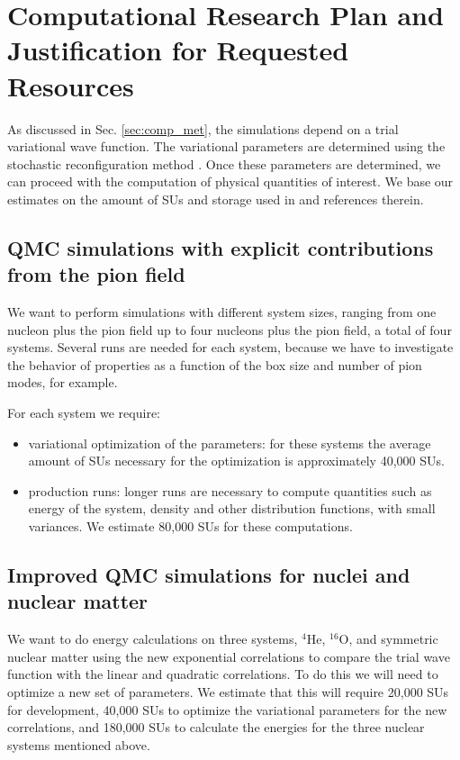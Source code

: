\documentclass[12pt,letterpaper]{article}
\begin{document}
\section{Computational Research Plan and Justification for Requested 
Resources}

As discussed in Sec. \ref{sec:comp_met}, the simulations depend on a trial 
variational wave function. The variational parameters are determined using 
the stochastic reconfiguration method \cite{cas04}. Once these parameters 
are determined, we can proceed with the computation of physical quantities 
of interest. We base our estimates on the amount of SUs and storage used in 
\cite{car15} 
and references therein.

\subsection{QMC simulations with explicit contributions from the pion field}

We want to perform simulations with different system 
sizes, ranging from one nucleon plus the pion field up to four nucleons plus 
the pion field, a total of four systems. Several runs are needed for each 
system, because we have to investigate the behavior of properties as a function 
of the box size and number of pion modes, for example.

For each system we require:
\begin{itemize}
	\item variational optimization of the parameters: for these systems the 
	average amount of SUs necessary for the optimization is approximately 
	40,000 SUs.
	\item production runs: longer runs are necessary to compute quantities 
	such as energy of the system, density and other distribution functions, 
	with small variances. We estimate 80,000 SUs for these computations.
\end{itemize}

\subsection{Improved QMC simulations for nuclei and nuclear matter}

We want to do energy calculations on three systems, $^4$He, $^{16}$O, and 
symmetric nuclear matter using the new exponential correlations to compare the 
trial wave function with the linear and quadratic correlations. To do this we 
will need to optimize a new set of parameters. We estimate that this will 
require 20,000 SUs for development, 40,000 SUs to optimize the variational 
parameters for the new correlations, and 180,000 SUs to calculate the energies 
for the three nuclear systems mentioned above.
\end{document}
